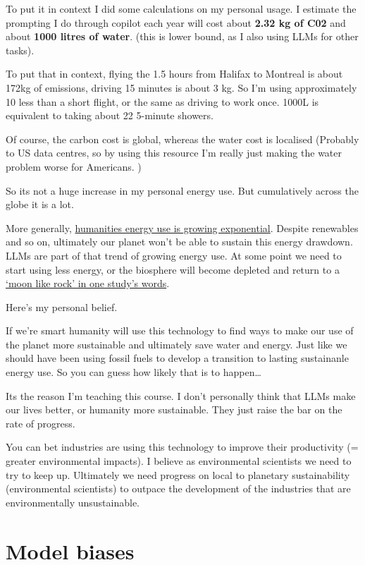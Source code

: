 \documentclass[
  letterpaper,
  DIV=11,
  numbers=noendperiod]{scrreprt}
\begin{document}
To put it in context I did some calculations on my personal usage. I
estimate the prompting I do through copilot each year will cost about
\textbf{2.32 kg of C02} and about \textbf{1000 litres of water}. (this
is lower bound, as I also using LLMs for other tasks).

To put that in context, flying the 1.5 hours from Halifax to Montreal is
about 172kg of emissions, driving 15 minutes is about 3 kg. So I'm using
approximately 10 less than a short flight, or the same as driving to
work once. 1000L is equivalent to taking about 22 5-minute showers.

Of course, the carbon cost is global, whereas the water cost is
localised (Probably to US data centres, so by using this resource I'm
really just making the water problem worse for Americans. )

So its not a huge increase in my personal energy use. But cumulatively
across the globe it is a lot.

More generally,
\href{https://www.pnas.org/doi/abs/10.1073/pnas.1508353112}{humanities
energy use is growing exponential}. Despite renewables and so on,
ultimately our planet won't be able to sustain this energy drawdown.
LLMs are part of that trend of growing energy use. At some point we need
to start using less energy, or the biosphere will become depleted and
return to a
\href{https://www.pnas.org/doi/abs/10.1073/pnas.1508353112}{`moon like
rock' in one study's words}.

Here's my personal belief.

If we're smart humanity will use this technology to find ways to make
our use of the planet more sustainable and ultimately save water and
energy. Just like we should have been using fossil fuels to develop a
transition to lasting sustainanle energy use. So you can guess how
likely that is to happen\ldots{}

Its the reason I'm teaching this course. I don't personally think that
LLMs make our lives better, or humanity more sustainable. They just
raise the bar on the rate of progress.

You can bet industries are using this technology to improve their
productivity (= greater environmental impacts). I believe as
environmental scientists we need to try to keep up. Ultimately we need
progress on local to planetary sustainability (environmental scientists)
to outpace the development of the industries that are environmentally
unsustainable.

\section{Model biases}\label{model-biases}
\end{document}
